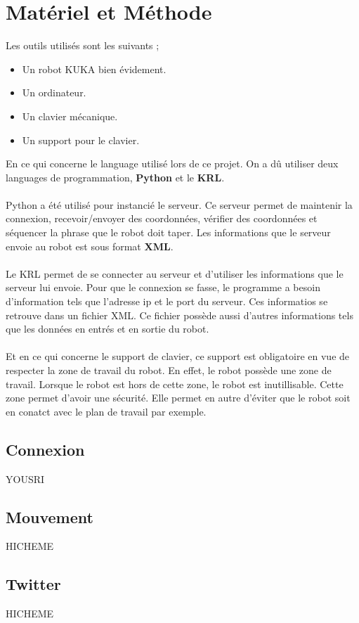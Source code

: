 \section{Matériel et Méthode}

Les outils utilisés sont les suivants ;

\begin{itemize}
    \item Un robot KUKA bien évidement.
    \item Un ordinateur.
    \item Un clavier mécanique.
    \item Un support pour le clavier.
\end{itemize}

En ce qui concerne le language utilisé lors de ce projet.
On a dû utiliser deux languages de programmation, \textbf{Python} et le \textbf{KRL}.
\\
\\
Python a été utilisé pour instancié le serveur.
Ce serveur permet de maintenir la connexion, recevoir/envoyer des coordonnées, vérifier des coordonnées et séquencer la phrase que le robot doit taper.
Les informations que le serveur envoie au robot est sous format \textbf{XML}.
\\
\\
Le KRL permet de se connecter au serveur et d'utiliser les informations que le serveur lui envoie.
Pour que le connexion se fasse, le programme a besoin d'information tels que l'adresse ip et le port du serveur.
Ces informatios se retrouve dans un fichier XML.
Ce fichier possède aussi d'autres informations tels que les données en entrés et en sortie du robot.
\\
\\
Et en ce qui concerne le support de clavier, ce support est obligatoire en vue de respecter la zone de travail du robot.
En effet, le robot possède une zone de travail.
Lorsque le robot est hors de cette zone, le robot est inutillisable.
Cette zone permet d'avoir une sécurité.
Elle permet en autre d'éviter que le robot soit en conatct avec le plan de travail par exemple.

\subsection{Connexion}

YOUSRI

\subsection{Mouvement}

HICHEME

\subsection{Twitter}

HICHEME

